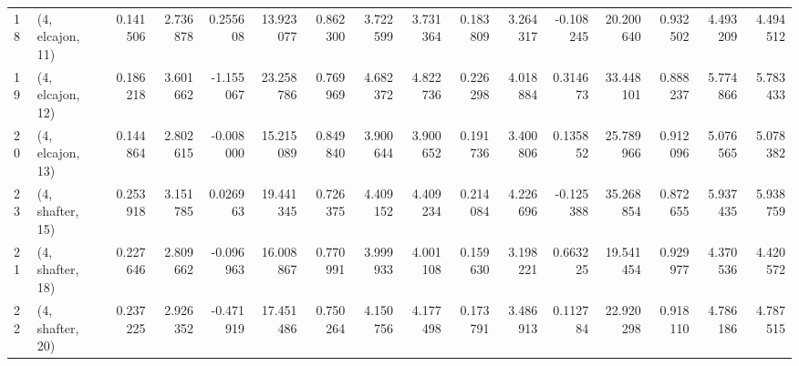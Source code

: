 \begin{tabular}{llrrrrrrrrrrrrrr}
18 &  (4, elcajon, 11) &   0.141506 &  2.736878 &  0.255608 &  13.923077 &  0.862300 &   3.722599 &  3.731364 &  0.183809 &   3.264317 & -0.108245 &   20.200640 &  0.932502 &   4.493209 &   4.494512 \\
19 &  (4, elcajon, 12) &   0.186218 &  3.601662 & -1.155067 &  23.258786 &  0.769969 &   4.682372 &  4.822736 &  0.226298 &   4.018884 &  0.314673 &   33.448101 &  0.888237 &   5.774866 &   5.783433 \\
20 &  (4, elcajon, 13) &   0.144864 &  2.802615 & -0.008000 &  15.215089 &  0.849840 &   3.900644 &  3.900652 &  0.191736 &   3.400806 &  0.135852 &   25.789966 &  0.912096 &   5.076565 &   5.078382 \\
23 &  (4, shafter, 15) &   0.253918 &  3.151785 &  0.026963 &  19.441345 &  0.726375 &   4.409152 &  4.409234 &  0.214084 &   4.226696 & -0.125388 &   35.268854 &  0.872655 &   5.937435 &   5.938759 \\
21 &  (4, shafter, 18) &   0.227646 &  2.809662 & -0.096963 &  16.008867 &  0.770991 &   3.999933 &  4.001108 &  0.159630 &   3.198221 &  0.663225 &   19.541454 &  0.929977 &   4.370536 &   4.420572 \\
22 &  (4, shafter, 20) &   0.237225 &  2.926352 & -0.471919 &  17.451486 &  0.750264 &   4.150756 &  4.177498 &  0.173791 &   3.486913 &  0.112784 &   22.920298 &  0.918110 &   4.786186 &   4.787515 \\
\bottomrule
\end{tabular}

